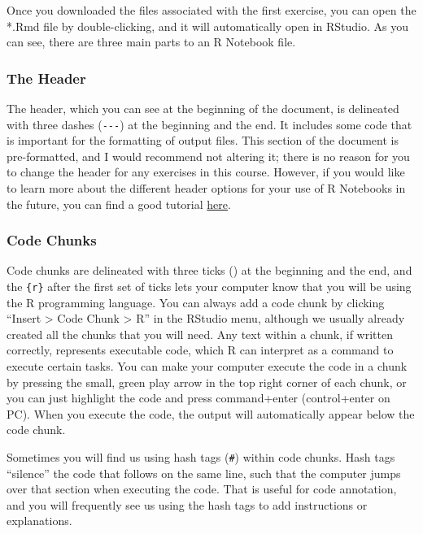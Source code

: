 \documentclass[
]{book}
\begin{document}
Once you downloaded the files associated with the first exercise, you can open the *.Rmd file by double-clicking, and it will automatically open in RStudio. As you can see, there are three main parts to an R Notebook file.

\hypertarget{the-header}{%
\subsubsection*{The Header}\label{the-header}}

The header, which you can see at the beginning of the document, is delineated with three dashes (\texttt{-\/-\/-}) at the beginning and the end. It includes some code that is important for the formatting of output files. This section of the document is pre-formatted, and I would recommend not altering it; there is no reason for you to change the header for any exercises in this course. However, if you would like to learn more about the different header options for your use of R Notebooks in the future, you can find a good tutorial \href{https://bookdown.org/yihui/rmarkdown/html-document.html\#table-of-contents}{here}.

\hypertarget{code-chunks}{%
\subsubsection*{Code Chunks}\label{code-chunks}}

Code chunks are delineated with three ticks (\texttt{\textquotesingle{}\textquotesingle{}\textquotesingle{}}) at the beginning and the end, and the \texttt{\{r\}} after the first set of ticks lets your computer know that you will be using the R programming language. You can always add a code chunk by clicking ``Insert \textgreater{} Code Chunk \textgreater{} R'' in the RStudio menu, although we usually already created all the chunks that you will need. Any text within a chunk, if written correctly, represents executable code, which R can interpret as a command to execute certain tasks. You can make your computer execute the code in a chunk by pressing the small, green play arrow in the top right corner of each chunk, or you can just highlight the code and press command+enter (control+enter on PC). When you execute the code, the output will automatically appear below the code chunk.

Sometimes you will find us using hash tags (\texttt{\#}) within code chunks. Hash tags ``silence'' the code that follows on the same line, such that the computer jumps over that section when executing the code. That is useful for code annotation, and you will frequently see us using the hash tags to add instructions or explanations.
\end{document}
